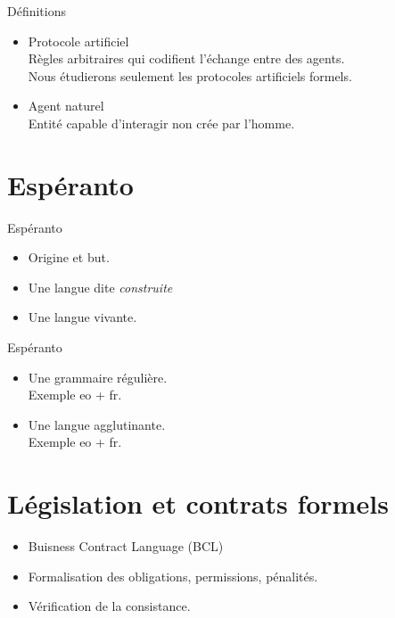 \documentclass{beamer}
\begin{document}
\begin{frame}
\begin{block}{Définitions}
\begin{itemize}
	\item Protocole artificiel\\
	Règles arbitraires qui codifient l'échange entre des agents.\\
	Nous étudierons seulement les protocoles artificiels formels.
	\item Agent naturel\\
	Entité capable d'interagir non crée par l'homme.
\end{itemize}
\end{block}
\end{frame}

\section{Espéranto}

\begin{frame}
\begin{center}
\huge Espéranto
\end{center}
\begin{itemize}
\item Origine et but.
\item Une langue dite \emph{construite}
\item Une langue vivante.
\end{itemize}
\end{frame}

\begin{frame}
\begin{center}
\huge Espéranto
\end{center}
\begin{itemize}
\item Une grammaire régulière.
\\ Exemple eo + fr.
\item Une langue agglutinante.
\\ Exemple eo + fr.
\end{itemize}
\end{frame}

\section[Contrats]{Législation et contrats formels}

\begin{frame}  
  \begin{itemize}
  \item Buisness Contract Language (BCL)%
  \item Formalisation des obligations, permissions, pénalités.%
  \item Vérification de la consistance.
  \end{itemize}
\end{frame}
\end{document}
